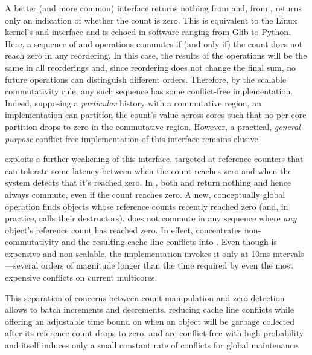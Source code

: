 A better (and more common) interface returns nothing from 
and, from , returns only an indication of whether the count
is zero.  This is equivalent to the Linux kernel's 
and  interface and is echoed in software
ranging from Glib to Python.  Here, a sequence of  and
 operations commutes if (and only if) the count does not
reach zero in any reordering.  In this case, the results of the
operations will be the same in all reorderings and, since reordering
does not change the final sum, no future operations can distinguish
different orders.  Therefore, by the scalable commutativity rule, any
such sequence has some conflict-free implementation.  Indeed,
supposing a \emph{particular} history with a commutative region, an
implementation can partition the count's value across cores such that
no per-core partition drops to zero in the commutative region.
However, a practical, \emph{general-purpose} conflict-free
implementation of this interface remains elusive.

 exploits a further weakening of this interface, targeted at
reference counters that can tolerate some latency between when the
count reaches zero and when the system detects that it's reached zero.
In , both  and  return nothing and hence
always commute, even if the count reaches zero.  A new, conceptually
global  operation finds objects whose reference counts
recently reached zero (and, in practice, calls their destructors).
 does not commute in any sequence where \emph{any}
object's reference count has reached zero.
%
%
In effect,  concentrates non-commutativity and the resulting
cache-line conflicts into .  Even though  is
expensive and non-scalable, the  implementation invokes it
only at 10ms intervals---several orders of magnitude longer than the
time required by even the most expensive conflicts on current
multicores.


This separation of concerns between count manipulation and zero
detection allows  to batch increments and decrements,
reducing cache line conflicts while offering an adjustable time bound
on when an object will be garbage collected after its reference count
drops to zero.   and  are conflict-free with high
probability and  itself induces only a small constant rate of
conflicts for global maintenance.

